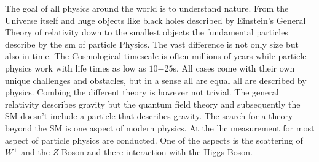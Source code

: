 \documentclass[../Bachelorarbeit.tex]{subfiles}
\begin{document}
The goal of all physics around the world is to understand nature. From the Universe itself and huge objects like black holes described by Einstein's General Theory of relativity down to the smallest objects the fundamental particles describe by the \acrfull{sm} of particle Physics.
The vast difference is not only size but also in time. The Cosmological timescale is often millions of years while particle physics work with life times as low as $10{-25}$s.
All cases come with their own unique challenges and obstacles, but in a sense all are equal all are described by physics. Combing the different theory is however not trivial.
The general relativity describes gravity but the quantum field theory and subsequently the SM doesn't include a particle that describes gravity. The search for a theory beyond the SM is one aspect of modern physics.
At the \acrfull{lhc} measurement for most aspect of particle physics are conducted. One of the aspects is the scattering of $W^{\pm }$ and the $Z$ Boson and there interaction with the Higgs-Boson.
\end{document}
